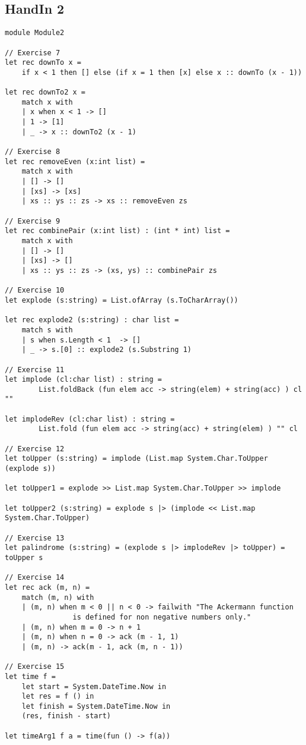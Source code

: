 \subsection{HandIn 2}
\label{Appendix_FSharp_Melnyk_2}
\begin{lstlisting}
module Module2

// Exercise 7
let rec downTo x = 
	if x < 1 then [] else (if x = 1 then [x] else x :: downTo (x - 1))

let rec downTo2 x = 
    match x with
    | x when x < 1 -> []
    | 1 -> [1]
    | _ -> x :: downTo2 (x - 1)

// Exercise 8
let rec removeEven (x:int list) = 
    match x with 
    | [] -> []
    | [xs] -> [xs]
    | xs :: ys :: zs -> xs :: removeEven zs

// Exercise 9
let rec combinePair (x:int list) : (int * int) list = 
    match x with
    | [] -> []
    | [xs] -> []
    | xs :: ys :: zs -> (xs, ys) :: combinePair zs

// Exercise 10
let explode (s:string) = List.ofArray (s.ToCharArray())

let rec explode2 (s:string) : char list = 
    match s with
    | s when s.Length < 1  -> []
    | _ -> s.[0] :: explode2 (s.Substring 1)

// Exercise 11
let implode (cl:char list) : string = 
		List.foldBack (fun elem acc -> string(elem) + string(acc) ) cl ""

let implodeRev (cl:char list) : string = 
		List.fold (fun elem acc -> string(acc) + string(elem) ) "" cl 

// Exercise 12
let toUpper (s:string) = implode (List.map System.Char.ToUpper (explode s))

let toUpper1 = explode >> List.map System.Char.ToUpper >> implode

let toUpper2 (s:string) = explode s |> (implode << List.map System.Char.ToUpper)

// Exercise 13
let palindrome (s:string) = (explode s |> implodeRev |> toUpper) = toUpper s

// Exercise 14
let rec ack (m, n) = 
    match (m, n) with
    | (m, n) when m < 0 || n < 0 -> failwith "The Ackermann function 
				is defined for non negative numbers only."
    | (m, n) when m = 0 -> n + 1
    | (m, n) when n = 0 -> ack (m - 1, 1)
    | (m, n) -> ack(m - 1, ack (m, n - 1))

// Exercise 15
let time f = 
    let start = System.DateTime.Now in
    let res = f () in
    let finish = System.DateTime.Now in
    (res, finish - start)

let timeArg1 f a = time(fun () -> f(a))
\end{lstlisting}
